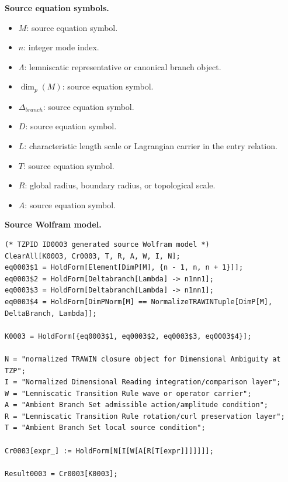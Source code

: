 \begin{minipage}[t]{0.49\linewidth}
\begingroup
\small
\raggedright
\textbf{Source equation symbols.}\par
\begin{itemize}[leftmargin=1.35em,itemsep=1pt,topsep=1pt,parsep=0pt]
    \item $M$: source equation symbol.
    \item $n$: integer mode index.
    \item $\Lambda$: lemniscatic representative or canonical branch object.
    \item $\dim_{p}(M)$: source equation symbol.
    \item $\Delta_{branch}$: source equation symbol.
    \item $D$: source equation symbol.
    \item $L$: characteristic length scale or Lagrangian carrier in the entry relation.
    \item $T$: source equation symbol.
    \item $R$: global radius, boundary radius, or topological scale.
    \item $A$: source equation symbol.
\end{itemize}
\endgroup
\end{minipage}\hfill
\begin{minipage}[t]{0.47\linewidth}
\begingroup
\scriptsize
\raggedright
\textbf{Source Wolfram model.}\par
\begin{Verbatim}[fontsize=\tiny,breaklines=true,breakanywhere=true]
(* TZPID ID0003 generated source Wolfram model *)
ClearAll[K0003, Cr0003, T, R, A, W, I, N];
eq0003$1 = HoldForm[Element[DimP[M], {n - 1, n, n + 1}]];
eq0003$2 = HoldForm[Deltabranch[Lambda] -> n1nn1];
eq0003$3 = HoldForm[Deltabranch[Lambda] -> n1nn1];
eq0003$4 = HoldForm[DimPNorm[M] == NormalizeTRAWINTuple[DimP[M], DeltaBranch, Lambda]];

K0003 = HoldForm[{eq0003$1, eq0003$2, eq0003$3, eq0003$4}];

N = "normalized TRAWIN closure object for Dimensional Ambiguity at TZP";
I = "Normalized Dimensional Reading integration/comparison layer";
W = "Lemniscatic Transition Rule wave or operator carrier";
A = "Ambient Branch Set admissible action/amplitude condition";
R = "Lemniscatic Transition Rule rotation/curl preservation layer";
T = "Ambient Branch Set local source condition";

Cr0003[expr_] := HoldForm[N[I[W[A[R[T[expr]]]]]]];

Result0003 = Cr0003[K0003];
\end{Verbatim}
\endgroup
\end{minipage}

